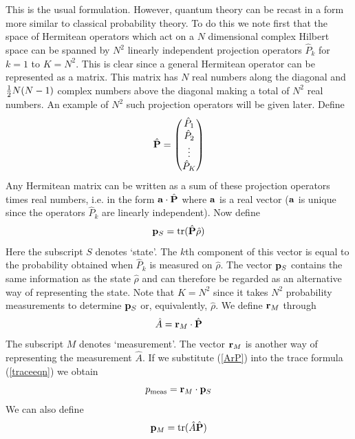 \documentclass[12pt]{article}
\begin{document}
This is the usual formulation.  However, quantum theory can be recast in
a form more similar to classical probability theory. To do this we note
first that the space of Hermitean operators which act on a $N$
dimensional complex Hilbert space can be spanned by $N^2$ linearly
independent projection
operators $\hat{P}_k$ for $k=1$ to $K=N^2$.  This is clear since a general
Hermitean operator can be represented as a matrix. This matrix has $N$
real numbers along the diagonal and ${1\over2}N(N-1)$ complex numbers
above the diagonal making a total of $N^2$ real numbers.  An example of
$N^2$ such projection operators will be given later.  Define
\begin{equation}
\hat{\bf P}=\left(
\begin{matrix} \hat{P}_1 \\ \hat{P}_2 \\ \vdots \\ \hat{P}_K
\end{matrix} \right)
\end{equation}
Any Hermitean matrix can be written as a sum of these projection
operators times real numbers, i.e. in the form ${\bf a}\cdot\hat{\bf P}$
where $\bf a$ is a real vector ($\bf a$ is unique since the operators
$\hat{P}_k$ are linearly independent).
Now define
\begin{equation}
{\bf p}_S = {\rm tr}(\hat{\bf P} \hat{\rho})
\end{equation}
Here the subscript $S$ denotes \lq state\rq.  The $k$th component of
this vector is equal to the probability obtained when $\hat{P}_k$ is
measured on $\hat{\rho}$.
The vector ${\bf p}_S$ contains the same information as the state
$\hat{\rho}$
and can therefore be regarded as an alternative way of representing the
state.  Note that $K=N^2$ since it takes $N^2$ probability measurements
to determine
${\bf p}_S$ or, equivalently, $\hat{\rho}$. We define ${\bf r}_M$
through 
\begin{equation}\label{ArP}
\hat{A} = {\bf r}_M\cdot\hat{\bf P}
\end{equation}
The subscript $M$ denotes \lq measurement\rq. The vector ${\bf r}_M$ is
another way of representing the measurement $\hat{A}$.  If we
substitute (\ref{ArP}) into the trace formula (\ref{traceeqn}) we obtain
\begin{equation}\label{Qrp}
p_{\rm meas}= {\bf r}_M\cdot {\bf p}_S
\end{equation}
We can also define
\begin{equation}
{\bf p}_M = {\rm tr}(\hat{A}\hat{\bf P})
\end{equation}
\end{document}
